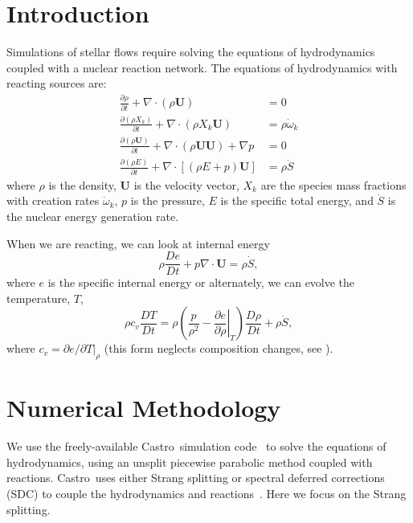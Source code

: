 \documentclass[times,preprint]{aastex631}
\newcommand{\castro}{{\sf Castro}}
\newcommand{\Ub}{\mathbf{U}}
\newcommand{\omegadot}{\dot{\omega}}
\newcommand{\Sdot}{\dot{S}}
\begin{document}
\section{Introduction}\label{Sec:Introduction}

Simulations of stellar flows require solving the equations of
hydrodynamics coupled with a nuclear reaction network.  The equations
of hydrodynamics with reacting sources are:
\begin{align}
\frac{\partial \rho}{\partial t} + \nabla \cdot (\rho \Ub) &= 0 \\
\frac{\partial (\rho X_k)}{\partial t} + \nabla \cdot (\rho X_k \Ub) &= \rho \omegadot_k \\
\frac{\partial (\rho \Ub)}{\partial t} + \nabla \cdot (\rho \Ub \Ub) + \nabla p &= 0 \\
\frac{\partial (\rho E)}{\partial t} + \nabla \cdot \left [ (\rho E + p) \Ub \right ] &= \rho \Sdot
\end{align}
where $\rho$ is the density, $\Ub$ is the velocity vector, $X_k$ are the species mass fractions
with creation rates $\omegadot_k$, $p$ is the pressure, $E$ is the
specific total energy, and $\Sdot$ is the nuclear energy generation rate.

When we are reacting, we can look at internal energy
\begin{equation}
\rho \frac{De}{Dt} + p \nabla \cdot \Ub = \rho \Sdot,
\end{equation}
where $e$ is the specific internal energy or alternately, we can evolve the temperature, $T$,
\begin{equation}
\rho c_v \frac{DT}{Dt} = \rho \left (\frac{p}{\rho^2} - \left .\frac{\partial e}{\partial \rho} \right |_T \right ) \frac{D\rho}{Dt} + \rho \Sdot,
\end{equation}
where $c_v = \partial e / \partial T |_\rho$ (this form neglects composition
changes, see \citealt{ABNZ:III}). 


\section{Numerical Methodology}

We use the freely-available \castro\ simulation
code~\citep{castro,castro_joss} to solve the equations of
hydrodynamics, using an unsplit piecewise parabolic method coupled with
reactions.  \castro\ uses either Strang splitting or
spectral deferred corrections (SDC) to couple the hydrodynamics and
reactions~\citep{castro_sdc}.  Here we focus on the Strang splitting.
\end{document}
